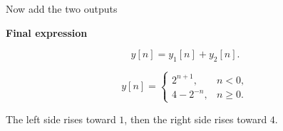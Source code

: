\documentclass[aspectratio=169,11pt]{beamer}
\newcommand{\CardTitleSize}{\large}
\newcommand{\CardTitle}[1]{%
  \vspace{0.15cm}
  {\CardTitleSize\bfseries #1}\par
}
\begin{document}
\begin{frame}{Now add the two outputs}

\begin{center}
\begin{GreenCard}[
  width=0.90\textwidth,
  halign=center,
  top=12pt,
  bottom=12pt
]
\CardTitle{Final expression}

\vspace{0.06cm}

\[
y[n]=y_1[n]+y_2[n].
\]

\vspace{0.08cm}



\[
\boxed{
y[n]
=
\begin{cases}
2^{n+1}, & n<0,\\[5pt]
4-2^{-n}, & n\ge 0.
\end{cases}}
\]

\vspace{0.06cm}

\begin{OrangeBox}[
  calloutshadedorange,
  halign=center,
  fontupper=\large
]{}
The left side rises toward \(1\), then the right side rises toward \(4\).
\end{OrangeBox}

\end{GreenCard}
\end{center}

\end{frame}
\end{document}
